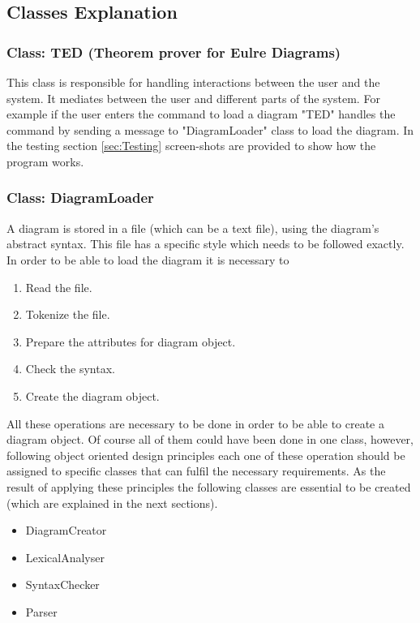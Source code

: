 \documentclass[10pt, a4paper, titlepage]{article}
\begin{document}
\newpage
\subsection{Classes Explanation}

\subsubsection{Class: TED (Theorem prover for Eulre Diagrams)}
This class is responsible for handling interactions between the user and the system. It mediates between the user and different parts of the system. For example if the user enters the command to load a diagram "TED" handles the command by sending a message to "DiagramLoader" class to load the diagram. In the testing section \ref{sec:Testing} screen-shots are provided to show how the program works.

\subsubsection{Class: DiagramLoader}
A diagram is stored in a file (which can be a text file), using the diagram's abstract syntax. This file has a specific style which needs to be followed exactly. In order to be able to load the diagram it is necessary to

\begin{enumerate}
\item Read the file.
\item Tokenize the file.
\item Prepare the attributes for diagram object.
\item Check the syntax.
\item Create the diagram object.
\end{enumerate}

All these operations are necessary to be done in order to be able to create a diagram object. Of course all of them could have been done in one class, however, following object oriented design principles each one of these operation should be assigned to specific classes that can fulfil the necessary requirements. As the result of applying these principles the following classes are essential to be created (which are explained in the next sections).

\begin{itemize}
\item DiagramCreator
\item LexicalAnalyser
\item SyntaxChecker
\item Parser
\end{itemize}
\end{document}
